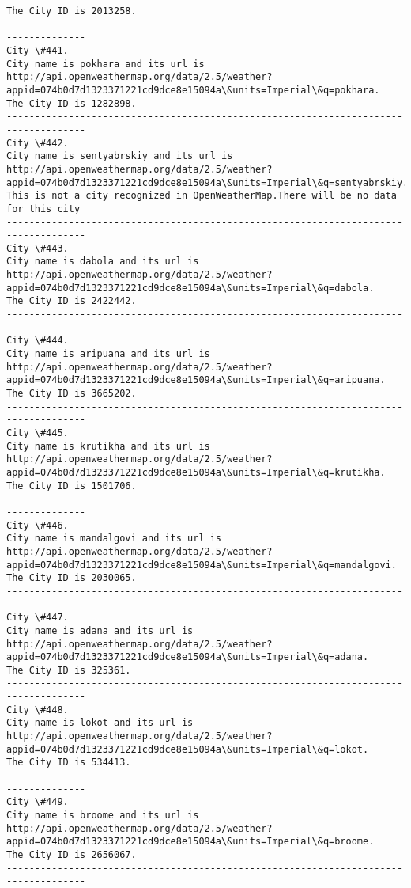 \documentclass[11pt]{article}
\begin{document}
\begin{Verbatim}[commandchars=\\\{\}]
The City ID is 2013258.
------------------------------------------------------------------------------------
City \#441.
City name is pokhara and its url is http://api.openweathermap.org/data/2.5/weather?appid=074b0d7d1323371221cd9dce8e15094a\&units=Imperial\&q=pokhara.
The City ID is 1282898.
------------------------------------------------------------------------------------
City \#442.
City name is sentyabrskiy and its url is http://api.openweathermap.org/data/2.5/weather?appid=074b0d7d1323371221cd9dce8e15094a\&units=Imperial\&q=sentyabrskiy.
This is not a city recognized in OpenWeatherMap.There will be no data for this city
------------------------------------------------------------------------------------
City \#443.
City name is dabola and its url is http://api.openweathermap.org/data/2.5/weather?appid=074b0d7d1323371221cd9dce8e15094a\&units=Imperial\&q=dabola.
The City ID is 2422442.
------------------------------------------------------------------------------------
City \#444.
City name is aripuana and its url is http://api.openweathermap.org/data/2.5/weather?appid=074b0d7d1323371221cd9dce8e15094a\&units=Imperial\&q=aripuana.
The City ID is 3665202.
------------------------------------------------------------------------------------
City \#445.
City name is krutikha and its url is http://api.openweathermap.org/data/2.5/weather?appid=074b0d7d1323371221cd9dce8e15094a\&units=Imperial\&q=krutikha.
The City ID is 1501706.
------------------------------------------------------------------------------------
City \#446.
City name is mandalgovi and its url is http://api.openweathermap.org/data/2.5/weather?appid=074b0d7d1323371221cd9dce8e15094a\&units=Imperial\&q=mandalgovi.
The City ID is 2030065.
------------------------------------------------------------------------------------
City \#447.
City name is adana and its url is http://api.openweathermap.org/data/2.5/weather?appid=074b0d7d1323371221cd9dce8e15094a\&units=Imperial\&q=adana.
The City ID is 325361.
------------------------------------------------------------------------------------
City \#448.
City name is lokot and its url is http://api.openweathermap.org/data/2.5/weather?appid=074b0d7d1323371221cd9dce8e15094a\&units=Imperial\&q=lokot.
The City ID is 534413.
------------------------------------------------------------------------------------
City \#449.
City name is broome and its url is http://api.openweathermap.org/data/2.5/weather?appid=074b0d7d1323371221cd9dce8e15094a\&units=Imperial\&q=broome.
The City ID is 2656067.
------------------------------------------------------------------------------------

\end{Verbatim}
\end{document}
